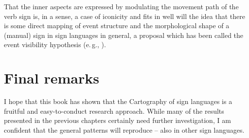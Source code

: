 That the inner aspects are expressed by modulating the movement path of the verb sign is, in a sense, a case of iconicity and fits in well will the idea that there is some direct mapping of event structure and the morphological shape of a (manual) sign in sign languages in general, a proposal which has been called the event visibility hypothesis (e.\,g., \citealt{wilbur2004event, wilbur2008complex, grose2007events}).





\section{Final remarks}
I hope that this book has shown that the Cartography of sign languages is a fruitful and easy-to-conduct research approach. While many of the results presented in the previous chapters certainly need further investigation, I am confident that the general patterns will reproduce -- also in other sign languages. 



